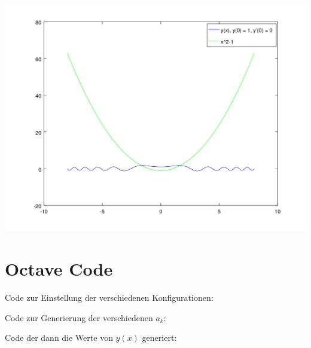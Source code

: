 \begin{refsection}
\includegraphics[scale=0.6]{./wellen/octave/images/a01a10/wavewithparabola.png}

\section{Octave Code}
Code zur Einstellung der verschiedenen Konfigurationen:


Code zur Generierung der verschiedenen $a_k$:


Code der dann die Werte von $y(x)$ generiert:

\printbibliography[heading=subbibliography]
\end{refsection}